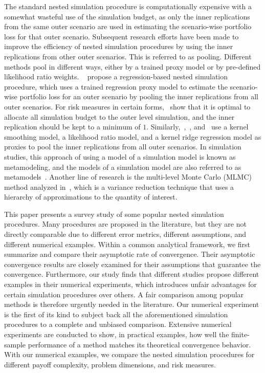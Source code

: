 The standard nested simulation procedure is computationally expensive with a somewhat wasteful use of the simulation budget, as only the inner replications from the same outer scenario are used in estimating the scenario-wise portfolio loss for that outer scenario. 
Subsequent research efforts have been made to improve the efficiency of nested simulation procedures by using the inner replications from other outer scenarios. 
This is referred to as pooling. 
Different methods pool in different ways, either by a trained proxy model or by pre-defined likelihood ratio weights.
~\cite{broadie2015risk} propose a regression-based nested simulation procedure, which uses a trained regression proxy model to estimate the scenario-wise portfolio loss for an outer scenario by pooling the inner replications from all outer scenarios.
For risk measures in certain forms,~\cite{broadie2015risk} show that it is optimal to allocate all simulation budget to the outer level simulation, and the inner replication should be kept to a minimum of $1$.
Similarly,~\cite{hong2017kernel},~\cite{feng2020optimal}, and~\cite{zhang2022sample} use a kernel smoothing model, a likelihood ratio model, and a kernel ridge regression model as proxies to pool the inner replications from all outer scenarios.
In simulation studies, this approach of using a model of a simulation model is known as metamodeling, and the models of a simulation model are also referred to as metamodels~\citep{barton1998simulation}.
Another line of research is the multi-level Monte Carlo (MLMC) method analyzed in~\cite{giles2019multilevel}, which is a variance reduction technique that uses a hierarchy of approximations to the quantity of interest.

This paper presents a survey study of some popular nested simulation procedures. 
Many procedures are proposed in the literature, but they are not directly comparable due to different error metrics, different assumptions, and different numerical examples.
Within a common analytical framework, we first summarize and compare their asymptotic rate of convergence.
Their asymptotic convergence results are closely examined for their assumptions that guarantee the convergence.
Furthermore, our study finds that different studies propose different examples in their numerical experiments, which introduces unfair advantages for certain simulation procedures over others. 
A fair comparison among popular methods is therefore urgently needed in the literature. 
Our numerical experiment is the first of its kind to subject back all the aforementioned simulation procedures to a complete and unbiased comparison. 
Extensive numerical experiments are conducted to show, in practical examples, how well the finite-sample performance of a method matches its theoretical convergence behavior. 
With our numerical examples, we compare the nested simulation procedures for different payoff complexity, problem dimensions, and risk measures. 

